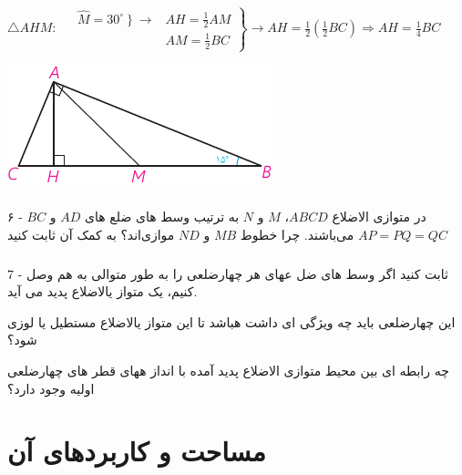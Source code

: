 \documentclass[12pt, a4paper]{book}
\begin{document}
	  \begin{minipage}{0.75\textwidth}
	     	\begin{flushleft}
	     		$ \triangle AHM:$
	     		$
	     			\left.
		     			\begin{array}{ccc}
		     			    &	\widehat{M} = \left. 30^{\circ} \right\} \rightarrow & AH = \frac12 AM \\
		     				& &AM = \frac12 BC
		     			\end{array}
	     			\right\}
	     			\rightarrow AH = \frac12 \left( \frac12 BC \right) \Rightarrow AH = \frac14 BC
	     		$
	     	\end{flushleft}
	  \end{minipage}   
	\begin{minipage}{.25\textwidth}
		\begin{flushleft}
			\includegraphics{"Shapes/Fasl - 3/Dars 1/PDFs/P64-S2.pdf"}
		\end{flushleft}
	\end{minipage}

	\subsubsection[6]{}
	 ۶ - در متوازی الاضلاع  
	 $ABCD$،
	 $M$ و $N$
	  به ترتیب وسط های ضلع های 
	  $AD$ و $BC$
	   می‌باشند. چرا خطوط
	   $MB$ و $ND$
	   موازی‌اند؟ به کمک آن ثابت کنید $AP = PQ = QC$
	\subsubsection[7]{}
7 - ثابت کنید اگر وسط های ضل عهای هر چهارضلعی را به طور متوالی به هم وصل کنیم، یک متواز یالاضلاع پدید می آید.
 
 این چهارضلعی باید چه ویژگی ای داشت هباشد تا این متواز یالاضلاع مستطیل یا لوزی شود؟
 
 چه رابطه ای بین محیط متوازی الاضلاع پدید آمده با انداز ههای قطر های چهارضلعی اولیه وجود دارد؟


\section{مساحت و کاربردهای آن}
\end{document}
